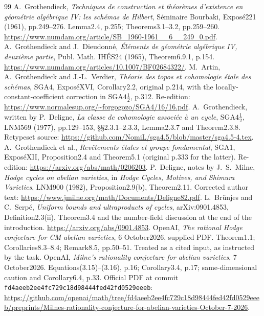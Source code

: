 \begin{thebibliography}{99}
 A.~Grothendieck, \emph{Techniques de construction et th\'eor\`emes d'existence en g\'eom\'etrie alg\'ebrique IV: les sch\'emas de Hilbert}, S\'eminaire Bourbaki, Expos\'e221 (1961), pp.249--276. Lemma2.4, p.255; Theorems3.1--3.2, pp.259--260. \url{https://www.numdam.org/article/SB_1960-1961__6__249_0.pdf}.
 A.~Grothendieck and J.~Dieudonn\'e, \emph{\'El\'ements de g\'eom\'etrie alg\'ebrique IV, deuxi\`eme partie}, Publ. Math. IH\'ES24 (1965), Theorem6.9.1, p.154. \url{https://www.numdam.org/articles/10.1007/BF02684322/}.
 M.~Artin, A.~Grothendieck and J.-L.~Verdier, \emph{Th\'eorie des topos et cohomologie \'etale des sch\'emas}, SGA4, Expos\'eXVI, Corollary2.2, original p.214, with the locally-constant-coefficient correction in SGA$4\frac12$, p.312. Re-edition: \url{https://www.normalesup.org/~forgogozo/SGA4/16/16.pdf}.
 A.~Grothendieck, written by P.~Deligne, \emph{La classe de cohomologie associ\'ee \`a un cycle}, SGA$4\frac12$, LNM569 (1977), pp.129--153, \S\S2.3.1--2.3.3, Lemma2.3.7 and Theorem2.3.8. Retypeset source: \url{https://github.com/NomiL/sga4.5/blob/master/sga4.5-4.tex}.
 A.~Grothendieck et al., \emph{Rev\^etements \'etales et groupe fondamental}, SGA1, Expos\'eXII, Proposition2.4 and Theorem5.1 (original p.333 for the latter). Re-edition: \url{https://arxiv.org/abs/math/0206203}.
 P.~Deligne, notes by J.~S.~Milne, \emph{Hodge cycles on abelian varieties}, in \emph{Hodge Cycles, Motives, and Shimura Varieties}, LNM900 (1982), Proposition2.9(b), Theorem2.11. Corrected author text: \url{https://www.jmilne.org/math/Documents/Deligne82.pdf}.
 L.~Br\"unjes and C.~Serp\'e, \emph{Uniform bounds and ultraproducts of cycles}, arXiv:0901.4853, Definition2.3(ii), Theorem3.4 and the number-field discussion at the end of the introduction. \url{https://arxiv.org/abs/0901.4853}.
 OpenAI, \emph{The rational Hodge conjecture for CM abelian varieties}, 6 October2026, supplied PDF. Theorem1.1; Corollaries8.3--8.4; Remark8.5, pp.50--51. Treated as a cited input, as instructed by the task.
 OpenAI, \emph{Milne's rationality conjecture for abelian varieties}, 7 October2026. Equations(3.15)--(3.16), p.16; Corollary3.4, p.17; same-dimensional caution and Corollary6.4, p.33. Official PDF at commit \texttt{fd4aeeb2ee4fc729c18d98444fed42fd0529eeeb}: \url{https://github.com/openai/math/tree/fd4aeeb2ee4fc729c18d98444fed42fd0529eeeb/preprints/Milnes-rationality-conjecture-for-abelian-varieties-October-7-2026}.

\end{thebibliography}
